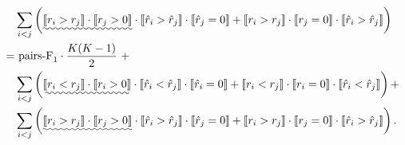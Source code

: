 \begin{align*}
   & \sum_{i < j} \left( \uwave{\llb r_i > r_j \rrb \cdot \llb r_j > 0 \rrb} \cdot
                         \llb \hat{r}_i > \hat{r}_j \rrb \cdot \llb \hat{r}_j = 0 \rrb +
                         \llb r_i > r_j \rrb \cdot \llb r_j = 0 \rrb \cdot
                         \llb \hat{r}_i > \hat{r}_j \rrb \right) \\
  =& ~\text{pairs-F}_1 \cdot \frac{K(K-1)}{2}~ + \\
   & \sum_{i < j} \left( \uwave{\llb r_i < r_j \rrb \cdot \llb r_i > 0 \rrb} \cdot
                         \llb \hat{r}_i < \hat{r}_j \rrb \cdot \llb \hat{r}_i = 0 \rrb + 
                         \llb r_i < r_j \rrb \cdot \llb r_i = 0 \rrb \cdot 
                         \llb \hat{r}_i < \hat{r}_j \rrb \right) + \\ 
   & \sum_{i < j} \left( \uwave{\llb r_i > r_j \rrb \cdot \llb r_j > 0 \rrb} \cdot
                         \llb \hat{r}_i > \hat{r}_j \rrb \cdot \llb \hat{r}_j = 0 \rrb +
                         \llb r_i > r_j \rrb \cdot \llb r_j = 0 \rrb \cdot
                         \llb \hat{r}_i > \hat{r}_j \rrb \right).
\end{align*}
